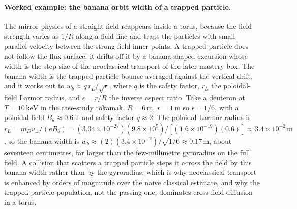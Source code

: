 \paragraph{Worked example: the banana orbit width of a trapped particle.}
The mirror physics of a straight field reappears inside a torus, because the
field strength varies as $1/R$ along a field line and traps the particles with
small parallel velocity between the strong-field inner points. A trapped
particle does not follow the flux surface; it drifts off it by a banana-shaped
excursion whose width is the step size of the neoclassical transport of the
later mastery box. The banana width is the trapped-particle bounce averaged
against the vertical drift, and it works out to $w_b \approx q\,r_L/\sqrt{\epsilon}$,
where $q$ is the safety factor, $r_L$ the poloidal-field Larmor radius, and
$\epsilon = r/R$ the inverse aspect ratio. Take a deuteron at $T = 10\,\si{\kilo
\electronvolt}$ in the case-study tokamak, $R = 6\,\si{\meter}$, $r = 1\,\si{
\meter}$ so $\epsilon = 1/6$, with a poloidal field $B_\theta \approx 0.6\,\si{
\tesla}$ and safety factor $q \approx 2$. The poloidal Larmor radius is $r_L =
m_D v_\perp/(eB_\theta) = (3.34\times 10^{-27})(9.8\times 10^{5})/[(1.6\times
10^{-19})(0.6)] \approx 3.4\times 10^{-2}\,\si{\meter}$, so the banana width is
$w_b \approx (2)(3.4\times 10^{-2})/\sqrt{1/6} \approx 0.17\,\si{\meter}$, about
seventeen centimetres, far larger than the few-millimetre gyroradius on the full
field. A collision that scatters a trapped particle steps it across the field by
this banana width rather than by the gyroradius, which is why neoclassical
transport is enhanced by orders of magnitude over the naive classical estimate,
and why the trapped-particle population, not the passing one, dominates
cross-field diffusion in a torus.


